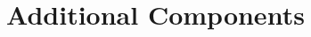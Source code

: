 \documentclass[../main/report.tex]{subfiles}
\begin{document}
\chapter{Additional Components}


\end{document}

